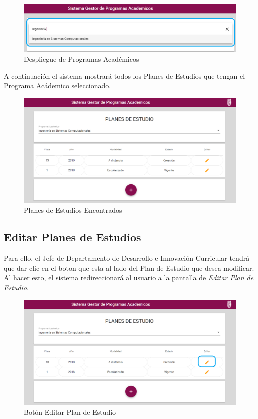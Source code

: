 \begin{figure}[!hbtp]
	\centering
	\hypertarget{academico2}{\includegraphics[width=0.7\linewidth]{images/SP4-GPE/programaD}}
	\caption{Despliegue de Programas Académicos}
	\label{academico2}
\end{figure}

A continuación el sistema mostrará todos los Planes de Estudios que tengan el Programa Acádemico seleccionado.
\begin{figure}[!hbtp]
	\centering
	\hypertarget{planes}{\includegraphics[width=0.7\linewidth]{images/SP4-GPE/consultar}}
	\caption{Planes de Estudios Encontrados}
	\label{planes}
\end{figure}
\newpage
\subsection{Editar Planes de Estudios}

Para ello, el Jefe de Departamento de Desarrollo e Innovación Curricular tendrá que dar clic en el boton  que esta al lado del Plan de Estudio que desea modificar. Al hacer esto, el sistema redireccionará al usuario a la pantalla de \hyperlink{editarPE}{\textit{Editar Plan de Estudio}}.

\begin{figure}[!hbtp]
	\centering
	\hypertarget{editar}{\includegraphics[width=0.7\linewidth]{images/SP4-GPE/editarC}}
	\caption{Botón Editar Plan de Estudio}
	\label{editar}
\end{figure}

